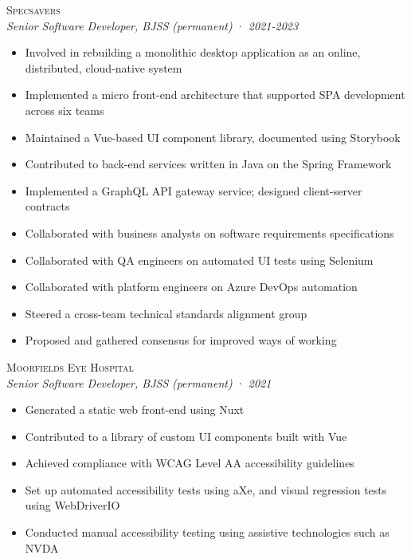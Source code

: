 \documentclass[a4paper,10pt]{article}
\newcommand{\resumeSubheading}[5][12pt]{
  \vspace{#1}
  {\scshape{#2}} \\
  \textit{\small{#3}} \textit{\small{(#4)}} · \textit{\small{#5}}
  \vspace{2pt}
}
\newcommand{\resumeListStart}{\begin{itemize}}
\newcommand{\resumeListEnd}{\end{itemize}}
\newcommand{\resumeItem}[1]{
  \item[\-·]\small{{#1\vspace{1pt}}}
}
\begin{document}

  \begin{minipage}{\textwidth}
    \resumeSubheading
      {Specsavers}
      {Senior Software Developer, BJSS}
      {permanent}
      {2021-2023}
    \resumeListStart
      \resumeItem{Involved in rebuilding a monolithic desktop application as an online, distributed, cloud-native system}
      \resumeItem{Implemented a micro front-end architecture that supported SPA development across six teams}
      \resumeItem{Maintained a Vue-based UI component library, documented using Storybook}
      \resumeItem{Contributed to back-end services written in Java on the Spring Framework}
      \resumeItem{Implemented a GraphQL API gateway service; designed client-server contracts}
      \resumeItem{Collaborated with business analysts on software requirements specifications}
      \resumeItem{Collaborated with QA engineers on automated UI tests using Selenium}
      \resumeItem{Collaborated with platform engineers on Azure DevOps automation}
      \resumeItem{Steered a cross-team technical standards alignment group}
      \resumeItem{Proposed and gathered consensus for improved ways of working}
    \resumeListEnd
  \end{minipage}


  \begin{minipage}{\textwidth}
    \resumeSubheading
      {Moorfields Eye Hospital}
      {Senior Software Developer, BJSS}
      {permanent}
      {2021}
    \resumeListStart
      \resumeItem{Generated a static web front-end using Nuxt}
      \resumeItem{Contributed to a library of custom UI components built with Vue}
      \resumeItem{Achieved compliance with WCAG Level AA accessibility guidelines}
      \resumeItem{Set up automated accessibility tests using aXe, and visual regression tests using WebDriverIO}
      \resumeItem{Conducted manual accessibility testing using assistive technologies such as NVDA}
    \resumeListEnd
  \end{minipage}
\end{document}
